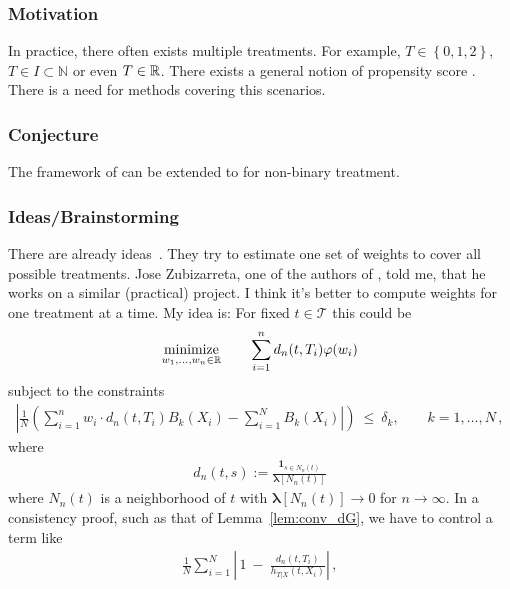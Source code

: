 \subsubsection{Motivation}
In practice, there often exists multiple treatments.
For example, $T\in \left\{
  0,1,2
\right\}$, $T\in I\subset \mathbb{N}$ or even $T\in\mathbb{R}$. 
There exists a general notion of propensity score \cite{Hirano2005}.
There is a need for methods covering this scenarios.
\subsubsection{Conjecture}
The framework of \cite{Wang2019} can be extended to for non-binary treatment.
\subsubsection{Ideas/Brainstorming}
There are already ideas~\cite{Tubbicke2020,Vegetabile2020}. They try to estimate one set of weights to cover all possible treatments.
Jose Zubizarreta, one of the authors of \cite{Wang2019}, told me, that he works on a similar (practical) project.
I think it's better to compute weights for one treatment at a time.
My idea is:
For fixed 
  $ t\in \mathcal{T} $
  this could be
  \begin{gather*}
    \underset{w_1, \ldots, w_n \in \mathbb{R}}{\mathrm{minimize}}
    \qquad
    \sum_{i = 1}^{n}
    d_n(t,T_i)
    \varphi(w_i)
  \end{gather*}
subject to the constraints
\begin{gather*}
    \left| 
      \frac{1}{N} 
      \left(
      \sum_{i = 1}^{n} 
      w_i  
      \cdot
    d_n(t,T_i)
      B_k(X_i)
      - 
      \sum_{i=1}^{N}
      B_k(X_i)
    \right|
      \right)
    \ 
    \le 
    \ 
    \delta_k,
    \qquad
    k = 1, \ldots, N
    \,,
\end{gather*}
where
\begin{gather}
  d_n(t,s)
  :=
  \frac{
  \mathbf{1} _ 
  { s \in N_n(t) }
}{
  \mathbf{\lambda}[N_n(t)]
}
\end{gather}
where $ N_n(t) $ is a neighborhood of $t$ with 
$  
  \mathbf{\lambda}[N_n(t)]
  \to
  0
  $
  for $ n \to \infty $.
  In a consistency proof, such as that of Lemma~\ref{lem:conv_dG},
  we have to control a term like
\begin{align*}
     \frac{1}{N}
     \sum_{i=1}^{N} 
     \left| 
     \,
      1
     \ 
      -
     \ 
     \frac
     {
     d_n(t,T_i)
     }
     {
        h_{T|X}(t,X_i)
     }
     \right|
     \,,
 \end{align*}
